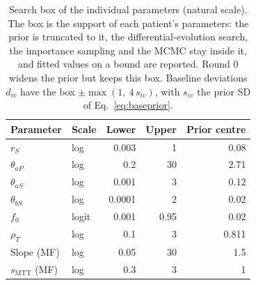 \begin{table}[!htbp]
\centering
\small
\setlength{\tabcolsep}{3.5pt}
\caption{Search box of the individual parameters (natural scale). The box is the support of each patient's parameters: the prior is truncated to it, the differential-evolution search, the importance sampling and the MCMC stay inside it, and fitted values on a bound are reported. Round 0 widens the prior but keeps this box. Baseline deviations $d_{iv}$ have the box $\pm\max(1,\ 4\,s_{iv})$, with $s_{iv}$ the prior SD of Eq.~\ref{eq:baseprior}.}
\label{tab:box}
\begin{tabular}{llrrr}
\toprule
Parameter & Scale & Lower & Upper & Prior centre \\
\midrule
$r_S$ & log & 0.003 & 1 & 0.08 \\
$\theta_{aP}$ & log & 0.2 & 30 & 2.71 \\
$\theta_{aS}$ & log & 0.001 & 3 & 0.12 \\
$\theta_{bS}$ & log & 0.0001 & 2 & 0.02 \\
$f_0$ & logit & 0.001 & 0.95 & 0.02 \\
$\rho_T$ & log & 0.1 & 3 & 0.811 \\
Slope (MF) & log & 0.05 & 30 & 1.5 \\
$s_{\mathrm{MTT}}$ (MF) & log & 0.3 & 3 & 1 \\
\bottomrule
\end{tabular}
\end{table}
